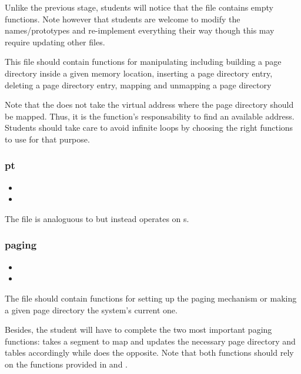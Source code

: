 Unlike the previous stage, students will notice that the  file
contains empty functions. Note however that students are welcome to modify
the names/prototypes and re-implement everything their way though this may
require updating other files.

This file should contain functions for manipulating  including building a page directory inside a given memory
location, inserting a page directory entry, deleting a page directory
entry, mapping and unmapping a page directory \etc{}

Note that the  does not take the virtual address
where the page directory should be mapped. Thus, it is the function's
responsability to find an available address. Students should take care
to avoid infinite loops by choosing the right functions to use for that
purpose.

\subsubsection*{pt}

\begin{itemize}
  \item
  \item
\end{itemize}

The file  is analoguous to  but instead operates
on s.

\subsubsection*{paging}

\begin{itemize}
  \item
  \item
\end{itemize}

The  file should contain functions for setting up the
paging mechanism or making a given page directory the system's current one.

Besides, the student will have to complete the two most important paging
functions:  takes a segment to map and
updates the necessary page directory and tables accordingly while
 does the opposite. Note that both
functions should rely on the functions provided in  and
.

